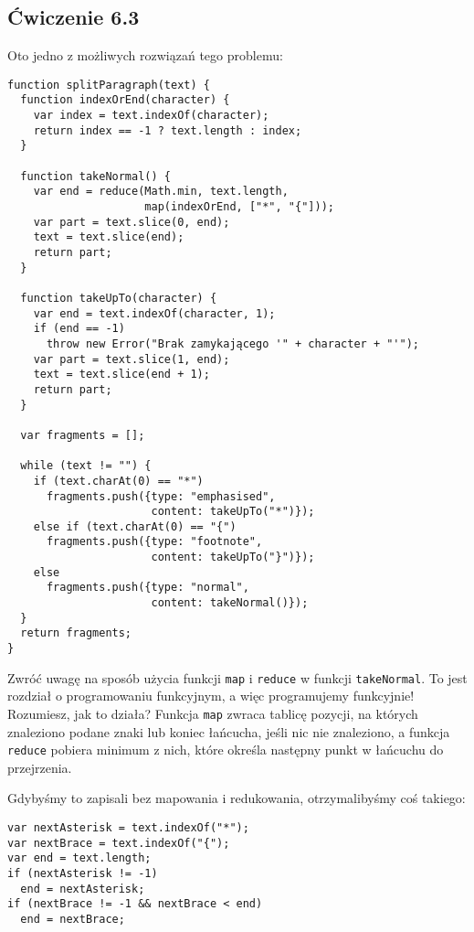   
\subsection*{Ćwiczenie 6.3}
\label{sol:6.3}
  
  
    
Oto jedno z możliwych rozwiązań tego problemu:

    
\begin{verbatim} 
function splitParagraph(text) {
  function indexOrEnd(character) {
    var index = text.indexOf(character);
    return index == -1 ? text.length : index;
  }

  function takeNormal() {
    var end = reduce(Math.min, text.length,
                     map(indexOrEnd, ["*", "{"]));
    var part = text.slice(0, end);
    text = text.slice(end);
    return part;
  }

  function takeUpTo(character) {
    var end = text.indexOf(character, 1);
    if (end == -1)
      throw new Error("Brak zamykającego '" + character + "'");
    var part = text.slice(1, end);
    text = text.slice(end + 1);
    return part;
  }

  var fragments = [];

  while (text != "") {
    if (text.charAt(0) == "*")
      fragments.push({type: "emphasised",
                      content: takeUpTo("*")});
    else if (text.charAt(0) == "{")
      fragments.push({type: "footnote",
                      content: takeUpTo("}")});
    else
      fragments.push({type: "normal",
                      content: takeNormal()});
  }
  return fragments;
}
\end{verbatim}
    
Zwróć uwagę na sposób użycia funkcji \texttt{map} i \texttt{reduce} w funkcji \texttt{takeNormal}. To jest rozdział o programowaniu funkcyjnym, a więc programujemy funkcyjnie! Rozumiesz, jak to działa? Funkcja \texttt{map} zwraca tablicę pozycji, na których znaleziono podane znaki lub koniec łańcucha, jeśli nic nie znaleziono, a funkcja \texttt{reduce} pobiera minimum z nich, które określa następny punkt w łańcuchu do przejrzenia.

    
Gdybyśmy to zapisali bez mapowania i redukowania, otrzymalibyśmy coś takiego:

    
\begin{verbatim} 
var nextAsterisk = text.indexOf("*");
var nextBrace = text.indexOf("{");
var end = text.length;
if (nextAsterisk != -1)
  end = nextAsterisk;
if (nextBrace != -1 && nextBrace < end)
  end = nextBrace;
 \end{verbatim}
    
